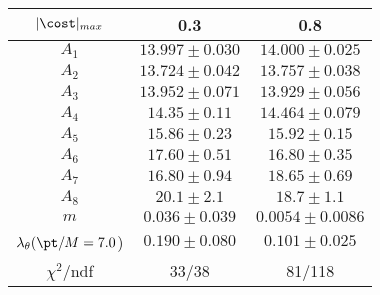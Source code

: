 \begin{tabular}{c|c|c}
$|\cost|_{max}$ & 0.3 & 0.8\\
\hline
$A_1$ & $13.997\pm0.030$ & $14.000\pm0.025$ \\
$A_2$ & $13.724\pm0.042$ & $13.757\pm0.038$ \\
$A_3$ & $13.952\pm0.071$ & $13.929\pm0.056$ \\
$A_4$ & $14.35\pm0.11$ & $14.464\pm0.079$ \\
$A_5$ & $15.86\pm0.23$ & $15.92\pm0.15$ \\
$A_6$ & $17.60\pm0.51$ & $16.80\pm0.35$ \\
$A_7$ & $16.80\pm0.94$ & $18.65\pm0.69$ \\
$A_8$ & $20.1\pm2.1$ & $18.7\pm1.1$ \\
$m$ & $0.036\pm0.039$ & $0.0054\pm0.0086$ \\
$\lambda_\theta(\pt/M = 7.0$) & $0.190\pm0.080$ & $0.101\pm0.025$ \\
\hline
$\chi^2$/ndf & 33/38 & 81/118
\end{tabular}
